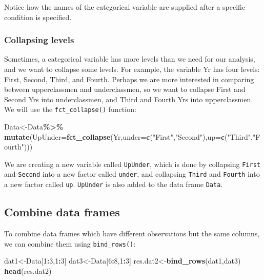 \documentclass[
]{book}
\newenvironment{Shaded}{\begin{snugshade}}{\end{snugshade}}
\newcommand{\AttributeTok}[1]{\textcolor[rgb]{0.13,0.29,0.53}{#1}}
\newcommand{\DecValTok}[1]{\textcolor[rgb]{0.00,0.00,0.81}{#1}}
\newcommand{\FunctionTok}[1]{\textcolor[rgb]{0.13,0.29,0.53}{\textbf{#1}}}
\newcommand{\NormalTok}[1]{#1}
\newcommand{\OtherTok}[1]{\textcolor[rgb]{0.56,0.35,0.01}{#1}}
\newcommand{\SpecialCharTok}[1]{\textcolor[rgb]{0.81,0.36,0.00}{\textbf{#1}}}
\newcommand{\StringTok}[1]{\textcolor[rgb]{0.31,0.60,0.02}{#1}}
\begin{document}
Notice how the names of the categorical variable are supplied after a specific condition is specified.

\hypertarget{collapsing-levels}{%
\subsubsection{Collapsing levels}\label{collapsing-levels}}

Sometimes, a categorical variable has more levels than we need for our analysis, and we want to collapse some levels. For example, the variable Yr has four levels: First, Second, Third, and Fourth. Perhaps we are more interested in comparing between upperclassmen and underclassmen, so we want to collapse First and Second Yrs into underclassmen, and Third and Fourth Yrs into upperclassmen. We will use the \texttt{fct\_collapse()} function:

\begin{Shaded}
\begin{Highlighting}[]
\NormalTok{Data}\OtherTok{\textless{}{-}}\NormalTok{Data}\SpecialCharTok{\%\textgreater{}\%}
  \FunctionTok{mutate}\NormalTok{(}\AttributeTok{UpUnder=}\FunctionTok{fct\_collapse}\NormalTok{(Yr,}\AttributeTok{under=}\FunctionTok{c}\NormalTok{(}\StringTok{"First"}\NormalTok{,}\StringTok{"Second"}\NormalTok{),}\AttributeTok{up=}\FunctionTok{c}\NormalTok{(}\StringTok{"Third"}\NormalTok{,}\StringTok{"Fourth"}\NormalTok{)))}
\end{Highlighting}
\end{Shaded}

We are creating a new variable called \texttt{UpUnder}, which is done by collapsing \texttt{First} and \texttt{Second} into a new factor called \texttt{under}, and collapsing \texttt{Third} and \texttt{Fourth} into a new factor called \texttt{up}. \texttt{UpUnder} is also added to the data frame \texttt{Data}.

\hypertarget{combine-data-frames-1}{%
\subsection{Combine data frames}\label{combine-data-frames-1}}

To combine data frames which have different observations but the same columns, we can combine them using \texttt{bind\_rows()}:

\begin{Shaded}
\begin{Highlighting}[]
\NormalTok{dat1}\OtherTok{\textless{}{-}}\NormalTok{Data[}\DecValTok{1}\SpecialCharTok{:}\DecValTok{3}\NormalTok{,}\DecValTok{1}\SpecialCharTok{:}\DecValTok{3}\NormalTok{]}
\NormalTok{dat3}\OtherTok{\textless{}{-}}\NormalTok{Data[}\DecValTok{6}\SpecialCharTok{:}\DecValTok{8}\NormalTok{,}\DecValTok{1}\SpecialCharTok{:}\DecValTok{3}\NormalTok{]}
\NormalTok{res.dat2}\OtherTok{\textless{}{-}}\FunctionTok{bind\_rows}\NormalTok{(dat1,dat3)}
\FunctionTok{head}\NormalTok{(res.dat2)}
\end{Highlighting}
\end{Shaded}
\end{document}
